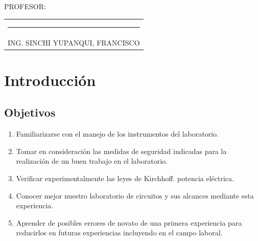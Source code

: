 \documentclass[a4paper,12pt]{report}
\begin{document}
{\large PROFESOR:} \\[2cm]
\begin{center}
\begin{tabular}{c}
\rule[3pt]{4.8in}{1pt}\\[1pt]
ING. SINCHI YUPANQUI, FRANCISCO 
\end{tabular}
\end{center}
\vfill
\newpage
\tableofcontents
\listoffigures
{}
\newpage
{} %
\setcounter{page}{1}  %
\part{Introducción}
\chapter{Objetivos}
\begin{enumerate}
\item Familiarizarse con el manejo de los instrumentos del laboratorio.
\item Tomar en consideración las medidas de seguridad indicadas para la realización de un buen trabajo en el laboratorio.
\item Verificar experimentalmente las leyes de Kirchhoff.
potencia eléctrica.
\item Conocer mejor nuestro laboratorio de circuitos y sus alcances mediante esta experiencia.
\item Aprender de posibles errores de novato de una primera experiencia para reducirlos en futuras experiencias incluyendo en el campo laboral.
\end{enumerate}
\end{document}
